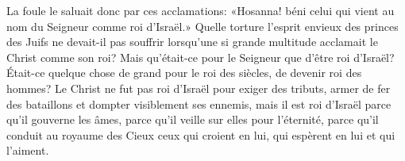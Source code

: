La foule le saluait donc par ces acclamations:
	«Hosanna! béni celui qui vient au nom du Seigneur comme roi d’Israël.»
Quelle torture l’esprit envieux des princes des Juifs ne devait-il pas souffrir
	lorsqu’une si grande multitude acclamait le Christ comme son roi?
Mais qu’était-ce pour le Seigneur que d’être roi d’Israël?
	Était-ce quelque chose de grand pour le roi des siècles,
	de devenir roi des hommes?
Le Christ ne fut pas roi d’Israël pour exiger des tributs,
	armer de fer des bataillons et dompter visiblement ses ennemis,
	mais il est roi d’Israël parce qu’il gouverne les âmes,
	parce qu’il veille sur elles pour l’éternité,
	parce qu’il conduit au royaume des Cieux ceux qui croient en lui,
	qui espèrent en lui et qui l’aiment.
